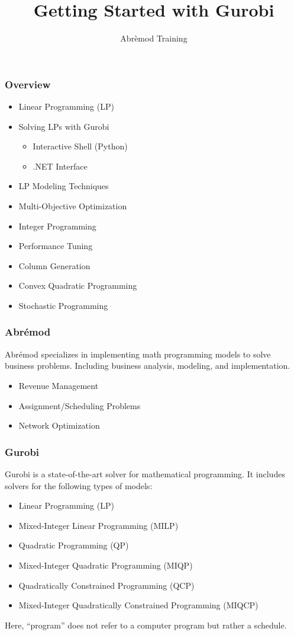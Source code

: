 \documentclass[12pt,handout]{beamer}
\title{Getting Started with Gurobi}
\author{Abr\`emod Training}
\begin{document}
\begin{frame}
\titlepage
\end{frame}

\begin{frame}
\frametitle{Overview}
\begin{itemize}
\item Linear Programming (LP)
\item Solving LPs with Gurobi
    \begin{itemize}
    \item Interactive Shell (Python)
    \item .NET Interface
    \end{itemize}
\item LP Modeling Techniques
\item Multi-Objective Optimization
\item Integer Programming
\item Performance Tuning
\item Column Generation
\item Convex Quadratic Programming
\item Stochastic Programming
\end{itemize}
\end{frame}

\begin{frame}
  \frametitle{Abr\'emod}
Abr\'emod specializes in implementing math programming models to solve business problems.
Including business analysis, modeling, and implementation.
\begin{itemize}
\item Revenue Management
\item Assignment/Scheduling Problems
\item Network Optimization
\end{itemize}
\end{frame}

\begin{frame}
\frametitle{Gurobi}
Gurobi is a state-of-the-art solver for mathematical programming. It includes solvers for the following types of models:
\begin{itemize}
\item Linear Programming (LP)
\item Mixed-Integer Linear Programming (MILP)
\item Quadratic Programming (QP)
\item Mixed-Integer Quadratic Programming (MIQP)
\item Quadratically Constrained Programming (QCP)
\item Mixed-Integer Quadratically Constrained Programming (MIQCP)
\end{itemize}
Here, ``program'' does not refer to a computer program but rather a schedule.
\end{frame}
\end{document}
